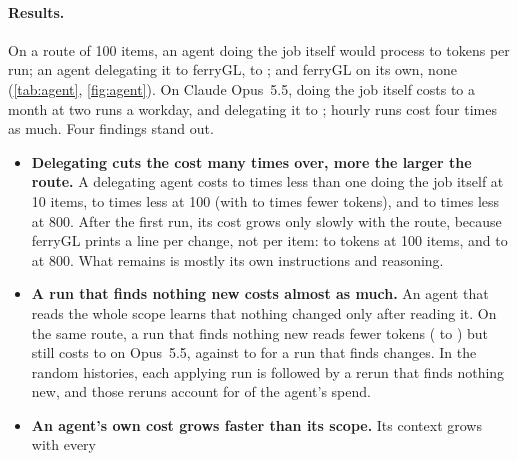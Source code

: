 \documentclass[11pt,a4paper]{article}
\newcommand{\ferry}{ferryGL}
\begin{document}
\paragraph{Results.} On a route of 100 items, an agent doing the job itself would process
\TokLeanOpusHundred{} to \TokPlausibleOpusHundred{} tokens per run; an agent
delegating it to \ferry, \TokLeanDelegatingOpusHundred{} to \TokPlausibleDelegatingOpusHundred{};
and \ferry{} on its own, none (\cref{tab:agent}, \cref{fig:agent}). On Claude Opus~5.5, doing
the job itself costs \MonthLeanOpusHundred{} to \MonthPlausibleOpusHundred{} a month at two runs
a workday, and delegating it \MonthLeanDelegatingOpusHundred{} to
\MonthPlausibleDelegatingOpusHundred{}; hourly runs cost four times as much. Four findings stand
out.
\begin{itemize}
  \item \textbf{Delegating cuts the cost many times over, more the larger the route.} A
    delegating agent costs \DelegationSavesTenLow{} to \DelegationSavesTenHigh{} times less than
    one doing the job itself at 10 items, \DelegationSavesHundredLow{} to
    \DelegationSavesHundredHigh{} times less at 100 (with \DelegationRatioHundredLow{} to
    \DelegationRatioHundredHigh{} times fewer tokens), and \DelegationSavesEightHundredLow{} to
    \DelegationSavesEightHundredHigh{} times less at 800. After the first run, its cost grows
    only slowly with the route, because \ferry{} prints a line per change, not per item:
    \TokLeanDelegatingOpusHundred{} to \TokPlausibleDelegatingOpusHundred{} tokens at 100 items,
    and \TokLeanDelegatingOpusEightHundred{} to \TokPlausibleDelegatingOpusEightHundred{} at
    800. What remains is mostly its own instructions and reasoning.
  \item \textbf{A run that finds nothing new costs almost as much.} An agent that reads the
    whole scope learns that nothing changed only after reading it. On the same route, a run that
    finds nothing new reads fewer tokens (\QuietTokLeanOpusHundred{} to
    \QuietTokPlausibleOpusHundred{}) but still costs \QuietRunLeanOpusHundred{} to
    \QuietRunPlausibleOpusHundred{} on Opus~5.5, against \RunLeanOpusHundred{} to
    \RunPlausibleOpusHundred{} for a run that finds \CmpChanges{} changes. In the random
    histories, each applying run is followed by a rerun that finds nothing new, and those reruns
    account for \HistPlausibleOpusQuiet{} of the agent's spend.
  \item \textbf{An agent's own cost grows faster than its scope.} Its context grows with every

\end{itemize}
\end{document}
